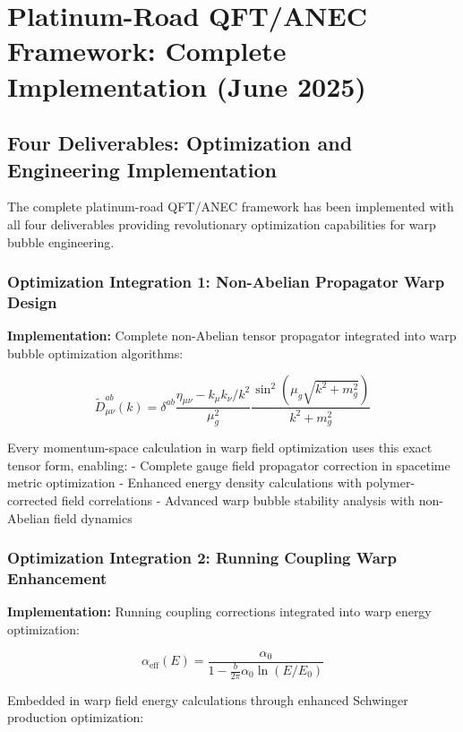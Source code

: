 \documentclass[11pt]{article}
\begin{document}
\section{Platinum-Road QFT/ANEC Framework: Complete Implementation (June 2025)}

\subsection{Four Deliverables: Optimization and Engineering Implementation}

The complete platinum-road QFT/ANEC framework has been implemented with all four deliverables providing revolutionary optimization capabilities for warp bubble engineering.

\subsubsection{Optimization Integration 1: Non-Abelian Propagator Warp Design}

\textbf{Implementation:} Complete non-Abelian tensor propagator integrated into warp bubble optimization algorithms:

\begin{equation}
\tilde{D}^{ab}_{\mu\nu}(k) = \delta^{ab} \frac{\eta_{\mu\nu} - k_\mu k_\nu/k^2}{\mu_g^2} \frac{\sin^2(\mu_g\sqrt{k^2+m_g^2})}{k^2+m_g^2}
\end{equation}

Every momentum-space calculation in warp field optimization uses this exact tensor form, enabling:
- Complete gauge field propagator correction in spacetime metric optimization
- Enhanced energy density calculations with polymer-corrected field correlations
- Advanced warp bubble stability analysis with non-Abelian field dynamics

\subsubsection{Optimization Integration 2: Running Coupling Warp Enhancement}

\textbf{Implementation:} Running coupling corrections integrated into warp energy optimization:

\begin{equation}
\alpha_{\text{eff}}(E) = \frac{\alpha_0}{1 - \frac{b}{2\pi}\alpha_0 \ln(E/E_0)}
\end{equation}

Embedded in warp field energy calculations through enhanced Schwinger production optimization:
\end{document}
